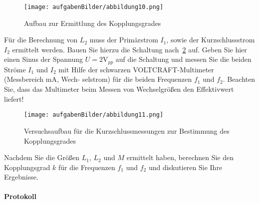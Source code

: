 \documentclass[10pt]{scrreprt}
\begin{document}
        \begin{center}
            \begin{figure}[H]
                \texttt{[image: aufgabenBilder/abbildung10.png]}
                \caption{Aufbau zur Ermittlung des Kopplungsgrades}
                \label{fig:abb10}
            \end{figure}
        \end{center}

        Für die Berechnung von $L_2$ muss der Primärstrom $I_1$, sowie der Kurzschlussstrom $I_2$
        ermittelt werden. Bauen Sie hierzu die Schaltung nach~\ref{fig:abb11} auf. Geben Sie hier
        einen Sinus der Spannung $U = 2\si{\volt}_{pp}$ auf die Schaltung und messen Sie die beiden Ströme
        $I_1$ und $I_2$ mit Hilfe der schwarzen VOLTCRAFT-Multimeter (Messbereich mA, Wech-
        selstrom) für die beiden Frequenzen $f_1$ und $f_2$. Beachten Sie, dass das Multimeter beim
        Messen von Wechselgrößen den Effektivwert liefert!

        \begin{center}
            \begin{figure}[H]
                \texttt{[image: aufgabenBilder/abbildung11.png]}
                \caption{Versuchsaufbau für die Kurzschlussmessungen zur Bestimmung des Kopplungsgrades}
                \label{fig:abb11}
            \end{figure}
        \end{center}

        Nachdem Sie die Größen $L_1$, $L_2$ und $M$ ermittelt haben, berechnen Sie den Kopplungsgrad
        $k$ für die Frequenzen $f_1$ und $f_2$ und diskutieren Sie Ihre Ergebnisse.

        \paragraph{Protokoll}


\end{document}
